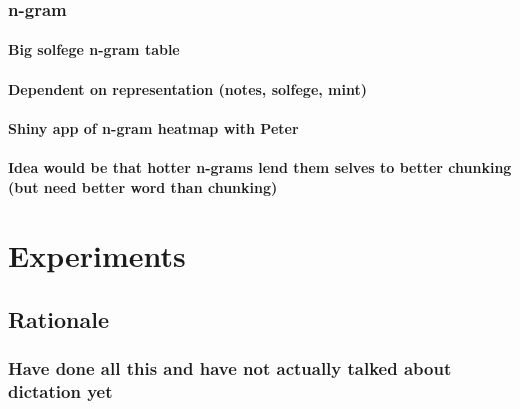 \documentclass[]{book}
\theoremstyle{definition}
\theoremstyle{definition}
\theoremstyle{definition}
\theoremstyle{remark}
\begin{document}
\hypertarget{n-gram}{%
\subsection{n-gram}\label{n-gram}}

\hypertarget{big-solfege-n-gram-table}{%
\subsubsection{Big solfege n-gram
table}\label{big-solfege-n-gram-table}}

\hypertarget{dependent-on-representation-notes-solfege-mint}{%
\subsubsection{Dependent on representation (notes, solfege,
mint)}\label{dependent-on-representation-notes-solfege-mint}}

\hypertarget{shiny-app-of-n-gram-heatmap-with-peter}{%
\subsubsection{Shiny app of n-gram heatmap with
Peter}\label{shiny-app-of-n-gram-heatmap-with-peter}}

\hypertarget{idea-would-be-that-hotter-n-grams-lend-them-selves-to-better-chunking-but-need-better-word-than-chunking}{%
\subsubsection{Idea would be that hotter n-grams lend them selves to
better chunking (but need better word than
chunking)}\label{idea-would-be-that-hotter-n-grams-lend-them-selves-to-better-chunking-but-need-better-word-than-chunking}}

\hypertarget{experiments}{%
\chapter{Experiments}\label{experiments}}

\hypertarget{rationale}{%
\section{Rationale}\label{rationale}}

\hypertarget{have-done-all-this-and-have-not-actually-talked-about-dictation-yet}{%
\subsection{Have done all this and have not actually talked about
dictation
yet}\label{have-done-all-this-and-have-not-actually-talked-about-dictation-yet}}
\end{document}
